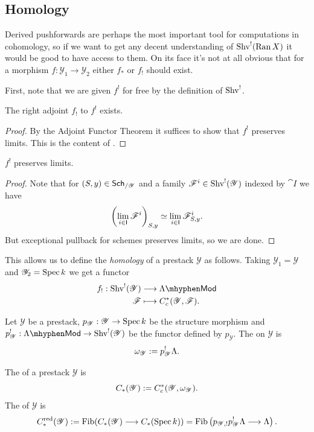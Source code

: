 \documentclass[oneside]{amsart}
\newcommand{\CY}{\mathcal{Y}}
\newcommand{\redu}{^{\mathrm{red}}}
\DeclareMathOperator{\Fib}{Fib}
\begin{document}
\subsection{Homology}
Derived pushforwards are perhaps the most important tool for computations in cohomology, so if we want to get any decent understanding of $\operatorname{Shv}^{!}(\operatorname{Ran} X)$ it would be good to have access to them. On its face it's not at all obvious that for a morphism $f:\CY_1\to \CY_2$ either $f_*$ or $f_!$ should exist.

First, note that we are given $f^{!}$ for free by the definition of $\operatorname{Shv}^{!}$.

\begin{proposition}
	The right adjoint $f_!$ to $f^{!}$ exists.
\end{proposition}
\begin{proof}
	By the Adjoint Functor Theorem \cite[Corollary~5.5.2.9(ii)]{htt} it suffices to show that $f^{!}$ preserves limits. This is the content of .
\end{proof}

\begin{lemma}\label{lmm:pres-lim}
	$f^{!}$ preserves limits.
\end{lemma}
\begin{proof}
	Note that for $(S,y)\in \Sch_{/\CY}$ and a family $\CF^{i}\in \Shv^{!}(\CY)$ indexed by $\cat{I}$ we have
	\[
		\left( \lim_{i\in \mathsf{I}}\mathscr{F}^{i} \right)_{S,y} \simeq \lim_{i\in \mathsf{I}} \mathscr{F}^{i}_{S,y}.
	\] 
	But exceptional pullback for schemes preserves limits, so we are done.
\end{proof}

This allows us to define the \emph{homology} of a prestack $\CY$ as follows. Taking $\CY_1=\CY$ and $\CY_2=\Spec k$ we get a functor
\begin{align*}
	f_!: \Shv^{!}(\CY) &\longrightarrow \lMod \\
	\CF &\longmapsto C_c^{*}(\CY,\CF).
\end{align*}
\begin{definition}
	Let $\CY$ be a prestack, $p_\CY:\CY\to \Spec k$ be the structure morphism and $p_\CY^{!}:\lMod\to \Shv^{!}(\CY)$ be the functor defined by $p_\CY$. The  on $\CY$ is
	\[
	\omega_\CY \defeq p_\CY^{!}\Lambda.
	\] 
\end{definition}
\begin{definition}
	The  of a prestack $\CY$ is
	\[
	C_*(\CY) \defeq C^{*}_c(\CY,\omega_\CY).
	\] 
	The  of $\CY$ is
	\[
	C_*\redu(\CY) \defeq \Fib(C_*(\CY)\to C_*(\Spec k)) = \Fib \left( p_{\CY,!}p_\CY^{!}\Lambda \to \Lambda \right) .	
	\] 
\end{definition}
\end{document}
